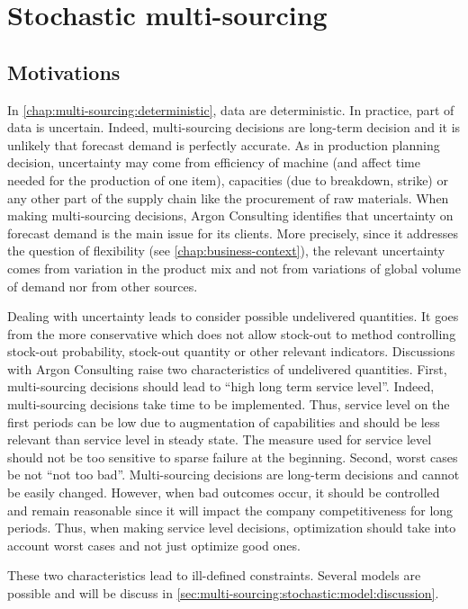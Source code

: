 \chapter{Stochastic multi-sourcing}
\label{chap:multi-sourcing:stochastic}


\section{Motivations}

In \cref{chap:multi-sourcing:deterministic}, data are deterministic.
In practice, part of data is uncertain.
Indeed, multi-sourcing decisions are long-term decision and it is unlikely that forecast demand is perfectly accurate.
As in production planning decision, uncertainty may come from efficiency of machine (and affect time needed for the production of one item), capacities (due to breakdown, strike) or any other part of the supply chain like the procurement of raw materials.
When making multi-sourcing decisions, Argon Consulting identifies that uncertainty on forecast demand is the main issue for its clients.
More precisely, since it addresses the question of flexibility (see \cref{chap:business-context}), the relevant uncertainty comes from variation in the product mix and not from variations of global volume of demand nor from other sources.


Dealing with uncertainty leads to consider possible undelivered quantities.
It goes from the more conservative which does not allow stock-out to method controlling stock-out probability, stock-out quantity or other relevant indicators.
Discussions with Argon Consulting raise two characteristics of undelivered quantities.
First, multi-sourcing decisions should lead to ``high long term service level''.
Indeed, multi-sourcing decisions take time to be implemented.
Thus, service level on the first periods can be low due to augmentation of capabilities and should be less relevant than service level in steady state.
The measure used for service level should not be too sensitive to sparse failure at the beginning.
Second, worst cases be not ``not too bad''.
Multi-sourcing decisions are long-term decisions and cannot be easily changed.
However, when bad outcomes occur, it should be controlled and remain reasonable since it will impact the company competitiveness for long periods.
Thus, when making service level decisions, optimization should take into account worst cases and not just optimize good ones.


These two characteristics lead to ill-defined constraints.
Several models are possible and will be discuss in \cref{sec:multi-sourcing:stochastic:model:discussion}.


